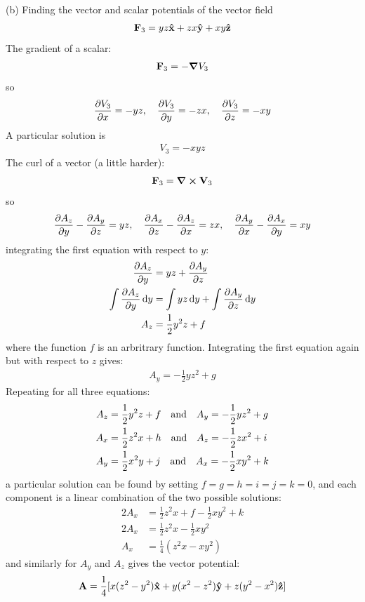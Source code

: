 \documentclass[../main.tex]{subfiles}
\begin{document}
(b) Finding the vector and scalar potentials of the vector field
\begin{align*}
    \vb{F}_3 = yz \vu{x} + zx \vu{y} + xy \vu{z}
\end{align*}
The gradient of a scalar:
\begin{align*}
    \vb{F}_3 = -\grad V_3
\end{align*}
so 
\begin{align*}
    \pdv{V_3}{x} = -yz ,\quad
    \pdv{V_3}{y} = -zx ,\quad
    \pdv{V_3}{z} = -xy
\end{align*}
A particular solution is
\begin{align*}
    V_3 = -xyz
\end{align*}
The curl of a vector (a little harder):
\begin{align*}
    \vb{F}_3 = \curl \vb{V}_3
\end{align*}
so
\begin{align*}
    \pdv{A_z}{y} - \pdv{A_y}{z} = yz ,\quad
    \pdv{A_x}{z} - \pdv{A_z}{x} = zx ,\quad
    \pdv{A_y}{x} - \pdv{A_x}{y} = xy
\end{align*} 
integrating the first equation with respect to $y$:
\begin{align*}
    \pdv{A_z}{y} &= yz + \pdv{A_y}{z} \\
    \int \pdv{A_z}{y} \dd{y} &= \int yz \dd{y} + \int \pdv{A_y}{z} \dd{y} \\
    A_z &= \frac{1}{2} y^2 z + f
\end{align*}
where the function $f$ is an arbritrary function. Integrating the first equation again but with
respect to $z$ gives:
\begin{align*}
    A_y = -\frac{1}{2} yz^2 + g
\end{align*}
Repeating for all three equations:
\begin{align*}
    A_z &= \frac{1}{2} y^2 z + f \qand A_y = -\frac{1}{2} yz^2 + g \\
    A_x &= \frac{1}{2} z^2 x + h \qand A_z = -\frac{1}{2} zx^2 + i \\
    A_y &= \frac{1}{2} x^2 y + j \qand A_x = -\frac{1}{2} xy^2 + k
\end{align*}
a particular solution can be found by setting $f = g = h = i = j = k = 0$, and each component is 
a linear combination of the two possible solutions:
\begin{align*}
    2 A_x &= \frac{1}{2} z^2 x + f - \frac{1}{2} xy^2 + k \\
    2 A_x &= \frac{1}{2} z^2 x - \frac{1}{2} xy^2 \\
    A_x &= \frac{1}{4} (z^2 x - xy^2)
\end{align*}
and similarly for $A_y$ and $A_z$ gives the vector potential:
\begin{align*}
    \vb{A} = \frac{1}{4} [x(z^2 - y^2) \vu{x} + y(x^2 - z^2) \vu{y} + z(y^2 - x^2)\vu{z}]
\end{align*}
\end{document}

